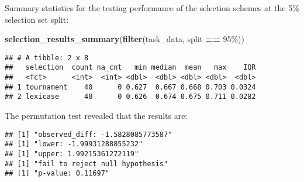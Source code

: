 \documentclass[
]{book}
\newenvironment{Shaded}{\begin{snugshade}}{\end{snugshade}}
\newcommand{\AttributeTok}[1]{\textcolor[rgb]{0.13,0.29,0.53}{#1}}
\newcommand{\DecValTok}[1]{\textcolor[rgb]{0.00,0.00,0.81}{#1}}
\newcommand{\FunctionTok}[1]{\textcolor[rgb]{0.13,0.29,0.53}{\textbf{#1}}}
\newcommand{\NormalTok}[1]{#1}
\newcommand{\OtherTok}[1]{\textcolor[rgb]{0.56,0.35,0.01}{#1}}
\newcommand{\SpecialCharTok}[1]{\textcolor[rgb]{0.81,0.36,0.00}{\textbf{#1}}}
\newcommand{\StringTok}[1]{\textcolor[rgb]{0.31,0.60,0.02}{#1}}
\begin{document}
Summary statistics for the testing performance of the selection schemes at the 5\% selection set split:

\begin{Shaded}
\begin{Highlighting}[]
\FunctionTok{selection\_results\_summary}\NormalTok{(}\FunctionTok{filter}\NormalTok{(task\_data, split }\SpecialCharTok{==} \StringTok{\textquotesingle{}95\%\textquotesingle{}}\NormalTok{))}
\end{Highlighting}
\end{Shaded}

\begin{verbatim}
## # A tibble: 2 x 8
##   selection  count na_cnt   min median  mean   max    IQR
##   <fct>      <int>  <int> <dbl>  <dbl> <dbl> <dbl>  <dbl>
## 1 tournament    40      0 0.627  0.667 0.668 0.703 0.0324
## 2 lexicase      40      0 0.626  0.674 0.675 0.711 0.0282
\end{verbatim}

The permutation test revealed that the results are:

\begin{Shaded}
\end{Shaded}

\begin{verbatim}
## [1] "observed_diff: -1.5828085773587"
## [1] "lower: -1.99931288855232"
## [1] "upper: 1.99215361272119"
## [1] "fail to reject null hypothesis"
## [1] "p-value: 0.11697"
\end{verbatim}
\end{document}
